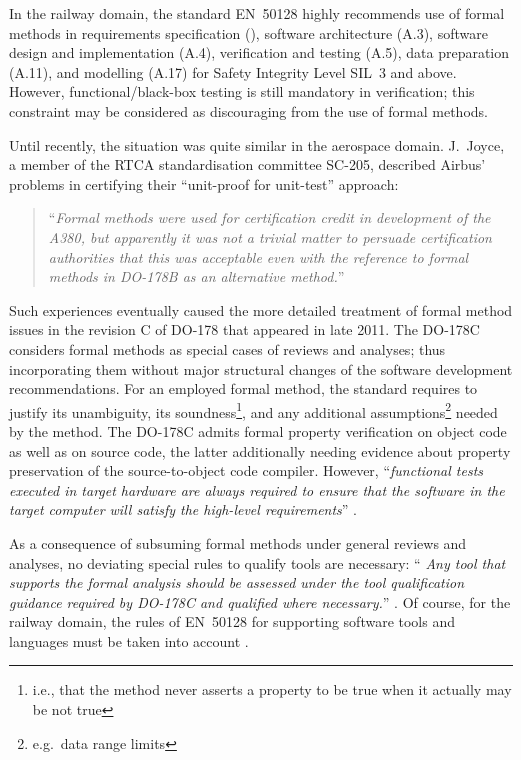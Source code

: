 \documentclass{template/openetcs_report}
\begin{document}
In the railway domain, the standard
EN~50128 highly recommends use of formal methods in
requirements specification (\cite[Table A.2]{en50128}),
software architecture (A.3),
software design and implementation (A.4),
verification and testing (A.5),
data preparation (A.11), and
modelling (A.17)
for Safety Integrity Level SIL~3 and above.
%
However, functional\slash black-box testing is still mandatory in
verification; this constraint may be considered as discouraging from
the use of formal methods.

Until recently, the situation was quite similar in the aerospace
domain.
%
J.\ Joyce, a member of the RTCA
standardisation committee SC-205, described
Airbus' problems in certifying their ``unit-proof for unit-test''
approach:

        \begin{quote}
        ``{\em Formal methods were used for certification credit in
        development of the A380, but apparently it was not a trivial
        matter to persuade certification authorities that this was
        acceptable even with the reference to formal methods in
        DO-178B as an alternative method.}''
        \end{quote}


Such experiences eventually caused the more detailed treatment of
formal method issues in the revision C of DO-178 that appeared in
late 2011.
%
The DO-178C considers formal methods as special cases of
reviews and analyses; thus incorporating them without major
structural changes of the software development recommendations.
%
For an employed formal method, the standard requires to justify its
unambiguity, its soundness\footnote{
        i.e., that the method never asserts a property to be true
        when it actually may be not true
},
and any additional assumptions\footnote{
        e.g.\ data range limits
}
needed by the method.
%
The DO-178C admits formal property verification on object code
as well as on source code, the latter additionally needing
evidence about property preservation of the source-to-object
code compiler.
%
However, ``{\em functional tests
executed in target hardware are always required to ensure that the
software in the target computer will satisfy the high-level requirements}''
\cite[FM.12.3.5]{DO-333}.

As a consequence of subsuming formal methods under general reviews and
analyses, no deviating special rules to qualify tools are necessary:
``{\em
Any tool that supports the formal analysis should be assessed under
the tool qualification
guidance required by DO-178C and qualified where necessary.}''
\cite[FM.1.6.2]{DO-333}.
Of course, for the railway domain, the rules of EN~50128 for supporting
software tools and languages must be taken into account
\cite[Section~6.7]{en50128}.
\end{document}
